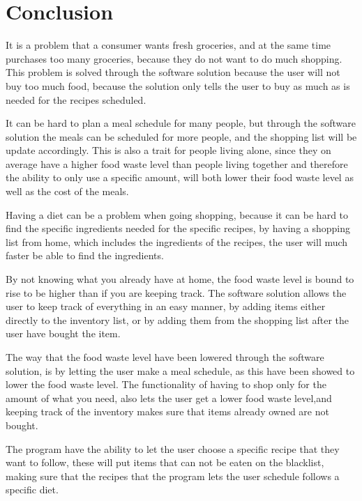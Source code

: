 \chapter{Conclusion}

It is a problem that a consumer wants fresh groceries, and at the same time purchases too many groceries, because they do not want to do much shopping. This problem is solved through the software solution because the user will not buy too much food, because the solution only tells the user to buy as much as is needed for the recipes scheduled.

It can be hard to plan a meal schedule for many people, but through the software solution the meals can be scheduled for more people, and the shopping list will be update accordingly. This is also a trait for people living alone, since they on average have a higher food waste level than people living together and therefore the ability to only use a specific amount, will both lower their food waste level as well as the cost of the meals.

Having a diet can be a problem when going shopping, because it can be hard to find the specific ingredients needed for the specific recipes, by having a shopping list from home, which includes the ingredients of the recipes, the user will much faster be able to find the ingredients.

By not knowing what you already have at home, the food waste level is bound to rise to be higher than if you are keeping track. The software solution allows the user to keep track of everything in an easy manner, by adding items either directly to the inventory list, or by adding them from the shopping list after the user have bought the item. 

The way that the food waste level have been lowered through the software solution, is by letting the user make a meal schedule, as this have been showed to lower the food waste level. The functionality of having to shop only for the amount of what you need, also lets the user get a lower food waste level,and keeping track of the inventory makes sure that items already owned are not bought.

The program have the ability to let the user choose a specific recipe that they want to follow, these will put items that can not be eaten on the blacklist, making sure that the recipes that the program lets the user schedule follows a specific diet.